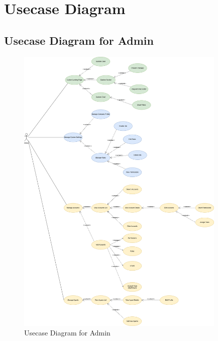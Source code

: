\section{Usecase Diagram}
\subsection{Usecase Diagram for Admin}
\begin{figure}[H]
    \centering
    \includegraphics[width=10cm]{graphics/usecase/freight-flex-UC-Admin.png}
    \caption{Usecase Diagram for Admin}
    \label{fig:Usecase Diagram for Admin}
\end{figure}

